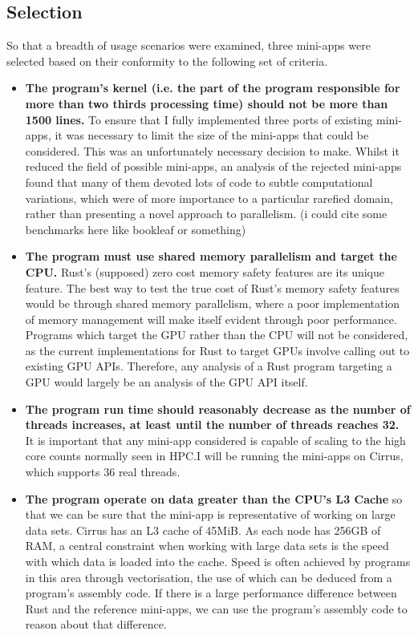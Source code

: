 \subsection{Selection}
So that a breadth of usage scenarios were examined, three mini-apps were selected based on their conformity to the following set of criteria.
\begin{itemize}
  \item \textbf{The program's kernel (i.e. the part of the program responsible for more than two thirds processing time) should not be more than 1500 lines.} To ensure that I fully implemented three ports of existing mini-apps, it was necessary to limit the size of the mini-apps that could be considered. This was an unfortunately necessary decision to make. Whilst it reduced the field of possible mini-apps, an analysis of the rejected mini-apps found that many of them devoted lots of code to subtle computational variations, which were of more importance to a particular rarefied domain, rather than presenting a novel approach to parallelism. (i could cite some benchmarks here like bookleaf or something)

  \item \textbf{The program must use shared memory parallelism and target the CPU.} Rust's (supposed) zero cost memory safety features are its unique feature. The best way to test the true cost of Rust's memory safety features would be through shared memory parallelism, where a poor implementation of memory management will make itself evident through poor performance. Programs which target the GPU rather than the CPU will not be considered, as the current implementations for Rust to target GPUs involve calling out to existing GPU APIs. Therefore, any analysis of a Rust program targeting a GPU would largely be an analysis of the GPU API itself.

  \item \textbf{The program run time should reasonably decrease as the number of threads increases, at least until the number of threads reaches 32.} It is important that any mini-app considered is capable of scaling to the high core counts normally seen in HPC.I will be running the mini-apps on Cirrus, which supports 36 real threads.

  \item \textbf{The program operate on data greater than the CPU's L3 Cache} so that we can be sure that the mini-app is representative of working on large data sets. Cirrus has an L3 cache of 45MiB. As each node has 256GB of RAM, a central constraint when working with large data sets is the speed with which data is loaded into the cache. Speed is often achieved by programs in this area through vectorisation, the use of which can be deduced from a program's assembly code. If there is a large performance difference between Rust and the reference mini-apps, we can use the program's assembly code to reason about that difference.


\end{itemize}
